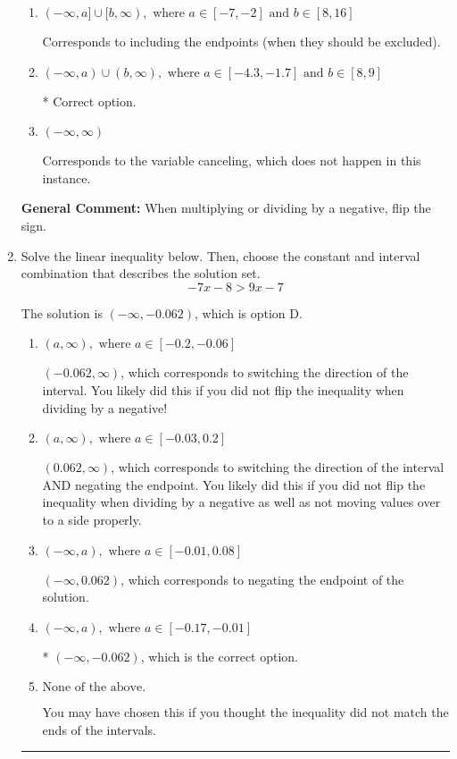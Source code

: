 \documentclass{extbook}[14pt]
\newcommand{\litem}[1]{\item #1

\rule{\textwidth}{0.4pt}}
\begin{document}
\begin{enumerate}
{\begin{enumerate}[label=\Alph*.]
Corresponds to including the endpoints AND negating.
\item \( (-\infty, a] \cup [b, \infty), \text{ where } a \in [-7, -2] \text{ and } b \in [8, 16] \)

Corresponds to including the endpoints (when they should be excluded).
\item \( (-\infty, a) \cup (b, \infty), \text{ where } a \in [-4.3, -1.7] \text{ and } b \in [8, 9] \)

 * Correct option.
\item \( (-\infty, \infty) \)

Corresponds to the variable canceling, which does not happen in this instance.
\end{enumerate}

\textbf{General Comment:} When multiplying or dividing by a negative, flip the sign.
}
\litem{
Solve the linear inequality below. Then, choose the constant and interval combination that describes the solution set.
\[ -7x -8 > 9x -7 \]

The solution is \( (-\infty, -0.062) \), which is option D.\begin{enumerate}[label=\Alph*.]
\item \( (a, \infty), \text{ where } a \in [-0.2, -0.06] \)

 $(-0.062, \infty)$, which corresponds to switching the direction of the interval. You likely did this if you did not flip the inequality when dividing by a negative!
\item \( (a, \infty), \text{ where } a \in [-0.03, 0.2] \)

 $(0.062, \infty)$, which corresponds to switching the direction of the interval AND negating the endpoint. You likely did this if you did not flip the inequality when dividing by a negative as well as not moving values over to a side properly.
\item \( (-\infty, a), \text{ where } a \in [-0.01, 0.08] \)

 $(-\infty, 0.062)$, which corresponds to negating the endpoint of the solution.
\item \( (-\infty, a), \text{ where } a \in [-0.17, -0.01] \)

* $(-\infty, -0.062)$, which is the correct option.
\item \( \text{None of the above}. \)

You may have chosen this if you thought the inequality did not match the ends of the intervals.
\end{enumerate}

}
\end{enumerate}
\end{document}
